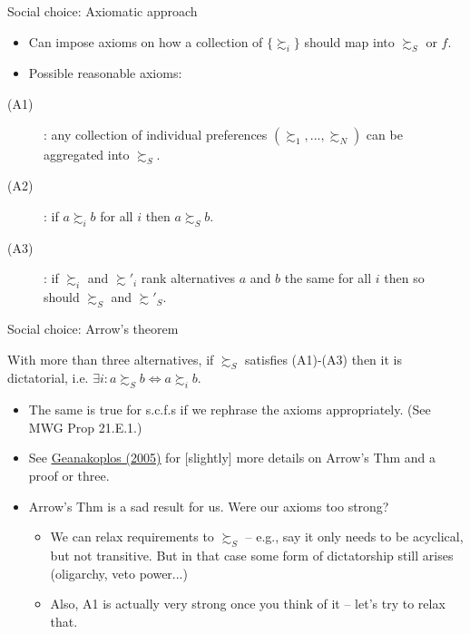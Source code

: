 \documentclass[english,10pt
,aspectratio=169
]{beamer}
\begin{document}
\begin{frame}{Social choice: Axiomatic approach}
	\begin{itemize}
		\item Can impose \alert{axioms} on how a collection of $\{\succsim_i\}$ should map into $\succsim_S$ or $f$.
		\item Possible reasonable axioms:
	\end{itemize}
	\begin{description}
		\item[(A1)] : any collection of individual preferences $\left(\succsim_1, ..., \succsim_N \right)$ can be aggregated into $\succsim_S$.
		\item[(A2)] : if $a \succsim_i b$ for all $i$ then $a \succsim_S b$.
		\item[(A3)] : if $\succsim_i$ and $\succsim'_i$ rank alternatives $a$ and $b$ the same for all $i$ then so should $\succsim_S$ and $\succsim'_S$.
	\end{description}
\end{frame}


\begin{frame}{Social choice: Arrow's theorem}
	\begin{theorem}[Arrow]
		With more than three alternatives, if $\succsim_S$ satisfies (A1)-(A3) then it is dictatorial, i.e. $\exists i: a \succsim_S b \Leftrightarrow a \succsim_i b$.
	\end{theorem}
	\begin{itemize}
		\item The same is true for s.c.f.s if we rephrase the axioms appropriately. (See MWG Prop 21.E.1.)
		\item See \href{https://link.springer.com/article/10.1007/s00199-004-0556-7}{\uline{Geanakoplos (2005)}} for [slightly] more details on Arrow's Thm and a proof or three.
		\item Arrow's Thm is a sad result for us. Were our axioms too strong?
		\begin{itemize}
			\item We can relax requirements to $\succsim_S$ -- e.g., say it only needs to be acyclical, but not transitive. But in that case some form of dictatorship still arises (oligarchy, veto power...)
			\item Also, A1 is actually very strong once you think of it -- let's try to relax that.
		\end{itemize}
	\end{itemize}
\end{frame}
\end{document}
